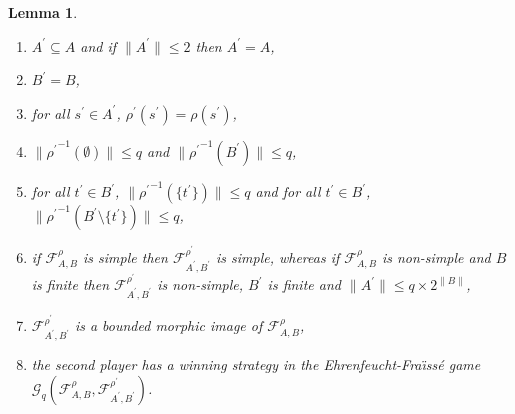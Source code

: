\documentclass[draft]{article}
\newtheorem{lemma}{Lemma}
\begin{document}
%
%
%
%
%
%
%
%
%
%
%
%
%
%
%
%
%
%
%
%
%
%
%
%
%
%
%
%
%
%
%
%
%
%
%
%
%
%
%
%
%
%
%
%
%
%
%
%
%
%
%
%
%
%
%
%
%
%
%
%
\begin{lemma}\label{lemma:the:alpha:reduction:is:always:dust:finite}
%
%
\begin{enumerate}
%
%
\item $A^{\prime}{\subseteq}A$ and if ${\parallel}A^{\prime}{\parallel}{\leq}2$ then $A^{\prime}{=}A$,
%
%
\item $B^{\prime}{=}B$,
%
%
\item for all $s^{\prime}{\in}A^{\prime}$, $\rho^{\prime}(s^{\prime}){=}\rho(s^{\prime})$,
%
%
\item ${\parallel}{\rho^{\prime}}^{{-}1}(\emptyset){\parallel}{\leq}q$ and ${\parallel}{\rho^{\prime}}^{{-}1}(B^{\prime}){\parallel}{\leq}q$,
%
%
\item for all $t^{\prime}{\in}B^{\prime}$, ${\parallel}{\rho^{\prime}}^{{-}1}(\{t^{\prime}\}){\parallel}{\leq}q$ and for all $t^{\prime}{\in}B^{\prime}$, ${\parallel}{\rho^{\prime}}^{{-}1}(B^{\prime}{\setminus}\{t^{\prime}\}){\parallel}{\leq}q$,
%
%
\item if ${\mathcal F}_{A,B}^{\rho}$ is simple then ${\mathcal F}_{A^{\prime},B^{\prime}}^{\rho^{\prime}}$ is simple, whereas if ${\mathcal F}_{A,B}^{\rho}$ is non-simple and $B$ is finite then ${\mathcal F}_{A^{\prime},B^{\prime}}^{\rho^{\prime}}$ is non-simple, $B^{\prime}$ is finite and ${\parallel}A^{\prime}{\parallel}{\leq}q{\times}2^{{\parallel}B{\parallel}}$,
%
%
\item ${\mathcal F}_{A^{\prime},B^{\prime}}^{\rho^{\prime}}$ is a bounded morphic image of ${\mathcal F}_{A,B}^{\rho}$,
%
%
\item the second player has a winning strategy in the Ehrenfeucht-Fra\"\i ss\'e game ${\mathcal G}_{q}({\mathcal F}_{A,B}^{\rho},{\mathcal F}_{A^{\prime},B^{\prime}}^{\rho^{\prime}})$.
%
%
\end{enumerate}
%
%
\end{lemma}
\end{document}
